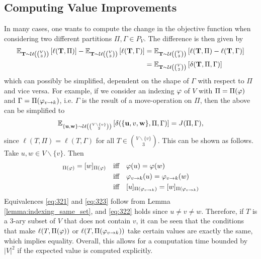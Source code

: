 \subsection{Computing Value Improvements}
In many cases, one wants to compute the change in the objective function when considering two different partitions $\Pi,\Gamma \in P_V$. The difference is then given by
\begin{align*}
    \mathbb{E}_{{\bf T} \sim \mathcal{U}\left(\binom{V}{3}\right)} \left[\ell({\bf T}, \Pi)\right] - \mathbb{E}_{{\bf T} \sim \mathcal{U}\left(\binom{V}{3}\right)} \left[\ell({\bf T}, \Gamma)\right] &= \mathbb{E}_{{\bf T} \sim \mathcal{U}\left(\binom{V}{3}\right)} \left[\ell({\bf T}, \Pi) - \ell({\bf T}, \Gamma)\right] \\
    &= \mathbb{E}_{{\bf T} \sim \mathcal{U}\left(\binom{V}{3}\right)} \left[\delta({\bf T}, \Pi, \Gamma)\right]
\end{align*}
which can possibly be simplified, dependent on the shape of $\Gamma$ with respect to $\Pi$ and vice versa. For example, if we consider an indexing $\varphi$ of $V$ with $\Pi = \Pi(\varphi)$ and $\Gamma = \Pi(\varphi_{v\rightarrow k})$, i.e. $\Gamma$ is the result of a move-operation on $\Pi$, then the above can be simplified to
\begin{align*}
    \mathbb{E}_{{\bf \{u,w\}} \sim \mathcal{U}\left(\binom{V\backslash\{v\}}{2}\right)} \left[\delta(\{{\bf u},v,{\bf w} \}, \Pi, \Gamma)\right] = J(\Pi, \Gamma),
\end{align*}
since $\ell(T,\Pi) = \ell(T,\Gamma)$ for all $T \in \binom{V \backslash \{ v\} }{3}$. This can be shown as follows. Take $u,w \in V\backslash\{v\}$. Then 
\begin{align}
    [u]_{\Pi(\idx)} = [w]_{\Pi(\idx)} &\iff \idx(u) = \idx(w)  \label{eq:321} \\
    &\iff \move{\idx}{v}{k}(u) = \move{\idx}{v}{k}(w)  \label{eq:322} \\
    &\iff [u]_{\Pi(\move{\idx}{v}{k})} = [w]_{\Pi(\move{\idx}{v}{k})}  \label{eq:323}
\end{align}
Equivalences \eqref{eq:321} and \eqref{eq:323} follow from Lemma \ref{lemma:indexing_same_set}, and \eqref{eq:322} holds since $u \neq v \neq w$. Therefore, if $T$ is a 3-ary subset of $V$ that does not contain $v$, it can be seen that the conditions that make $\ell(T,\Pi(\varphi))$ or $\ell(T,\Pi(\varphi_{v\rightarrow k}))$ take certain values are exactly the same, which implies equality. Overall, this allows for a computation time bounded by $|V|^2$ if the expected value is computed explicitly. 
